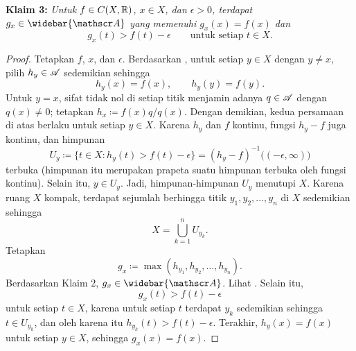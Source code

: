 \noindent
\textbf{Klaim 3:} \emph{Untuk $f \in C(X,{\mathbb{R}})$, $x \in X$, dan $\epsilon > 0$,
terdapat $g_x \in \widebar{\sA}$ yang memenuhi $g_x(x) = f(x)$ dan
}
\begin{equation*}
g_x(t) > f(t)-\epsilon \qquad \text{untuk setiap } t \in X.
\end{equation*}

\begin{proof}
Tetapkan $f$, $x$, dan $\epsilon$.
Berdasarkan , untuk setiap $y \in X$ dengan
$y \neq x$, pilih $h_y \in
{\mathscr{A}}$ sedemikian sehingga
\begin{equation*}
h_y(x) = f(x), \qquad h_y(y)=f(y) .
\end{equation*}
Untuk $y=x$, sifat tidak nol di setiap titik menjamin adanya $q \in {\mathscr{A}}$
dengan $q(x) \neq 0$; tetapkan $h_x \coloneqq f(x)q/q(x)$. Dengan demikian,
kedua persamaan di atas berlaku untuk setiap $y \in X$.
Karena $h_y$ dan $f$ kontinu, fungsi $h_y-f$ juga kontinu,
dan himpunan
\begin{equation*}
U_y \coloneqq
\bigl\{ t \in X : h_y(t) > f(t) -\epsilon \bigr\}
=
{(h_y-f)}^{-1} \bigl( (-\epsilon,\infty) \bigr)
\end{equation*}
terbuka (himpunan itu merupakan prapeta suatu himpunan terbuka oleh fungsi
kontinu). Selain itu, $y \in U_y$. Jadi, himpunan-himpunan $U_y$ menutupi
$X$. Karena ruang $X$ kompak, terdapat sejumlah berhingga titik
$y_1,y_2,\ldots,y_n$ di $X$ sedemikian sehingga
\begin{equation*}
X = \bigcup_{k=1}^n U_{y_k}  .
\end{equation*}
Tetapkan
\begin{equation*}
g_x \coloneqq \max(h_{y_1},h_{y_2},\ldots,h_{y_n}) .
\end{equation*}
Berdasarkan Klaim 2, $g_x \in \widebar{\sA}$. Lihat .
Selain itu,
\begin{equation*}
g_x(t) > f(t) -\epsilon
\end{equation*}
untuk setiap $t \in X$, karena untuk setiap $t$ terdapat $y_k$ sedemikian
sehingga $t \in U_{y_k}$, dan oleh karena itu
$h_{y_k}(t) > f(t) -\epsilon$.
Terakhir, $h_y(x) = f(x)$ untuk setiap $y \in X$, sehingga
$g_x(x) = f(x)$.
\end{proof}

